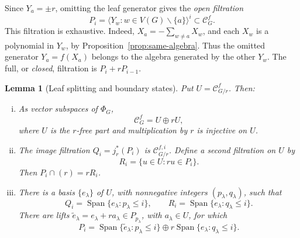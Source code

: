 \documentclass[reqno]{article}
\theoremstyle{plain} %
\newtheorem{lemma}[theorem]{Lemma}
\theoremstyle{definition}
\theoremstyle{remark}
\DeclareMathOperator{\Span}{Span}
\newcommand {\CC}{\mathscr{C}}
\numberwithin{equation}{section}
\begin{document}
Since \(Y_a=\pm r\), omitting the leaf generator gives the
\emph{open filtration}
\begin{equation}
\label{eq:open}
P_i=\bigl\langle Y_w:w\in V(G)\smallsetminus\{a\}\bigr\rangle^i
\subset\CC^f_G.
\end{equation}
This filtration is exhaustive. Indeed,
\(X_a=-\sum_{w\ne a}X_w\), and each \(X_w\) is a polynomial in
\(Y_w\), by Proposition~\ref{prop:same-algebra}. Thus the omitted generator
\(Y_a=f(X_a)\) belongs to the algebra generated by the other \(Y_w\).
The full, or \emph{closed}, filtration is \(P_i+rP_{i-1}\).

\begin{lemma}[Leaf splitting and boundary states]
\label{lem:split}
Put \(U=\CC^f_{G/r}\). Then:
\begin{enumerate}[(i)]
\item As vector subspaces of \(\Phi_G\),
\[
\CC^f_G=U\oplus rU,
\]
where \(U\) is the \(r\)-free part and multiplication by \(r\) is
injective on \(U\).
\item The image filtration \(Q_i=j_r^*(P_i)\) is
\(\CC^{f,i}_{G/r}\). Define a second filtration on \(U\) by
\[
R_i=\{u\in U:ru\in P_i\}.
\]
Then \(P_i\cap(r)=rR_i\).
\item There is a basis \(\{e_\lambda\}\) of \(U\), with nonnegative
integers \((p_\lambda,q_\lambda)\), such that
\[
Q_i=\Span\{e_\lambda:p_\lambda\le i\},\qquad
R_i=\Span\{e_\lambda:q_\lambda\le i\}.
\]
There are lifts
\(\widetilde e_\lambda=e_\lambda+ra_\lambda\in P_{p_\lambda}\),
with \(a_\lambda\in U\), for which
\begin{equation}
\label{eq:P-decomp}
P_i=\Span\{\widetilde e_\lambda:p_\lambda\le i\}
\oplus r\Span\{e_\lambda:q_\lambda\le i\}.
\end{equation}
\end{enumerate}
\end{lemma}
\end{document}
